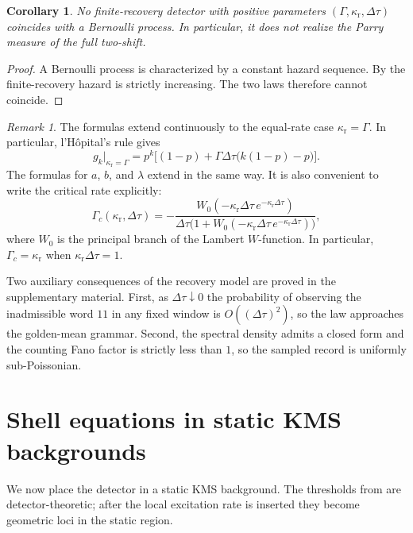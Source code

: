\documentclass[11pt]{amsart}
\numberwithin{equation}{section}
\newtheorem{corollary}[theorem]{Corollary}
\theoremstyle{remark}
\newtheorem{remark}[theorem]{Remark}
\begin{document}
\begin{corollary}\label{cor:no-exact-main}
No finite-recovery detector with positive parameters $(\Gamma,\kappa_{\mathrm r},\Delta\tau)$ coincides with a Bernoulli process. In particular, it does not realize the Parry measure of the full two-shift.
\end{corollary}

\begin{proof}
A Bernoulli process is characterized by a constant hazard sequence. By  the finite-recovery hazard is strictly increasing. The two laws therefore cannot coincide.
\end{proof}

\begin{remark}\label{rem:edge-cases}
The formulas extend continuously to the equal-rate case $\kappa_{\mathrm r}=\Gamma$. In particular, l'H\^opital's rule gives
\[
g_k\big|_{\kappa_{\mathrm r}=\Gamma}
=
p^k\bigl[(1-p)+\Gamma\Delta\tau\bigl(k(1-p)-p\bigr)\bigr].
\]
The formulas for $a$, $b$, and $\lambda$ extend in the same way. It is also convenient to write the critical rate explicitly:
\[
\Gamma_c(\kappa_{\mathrm r},\Delta\tau)
=
-\frac{W_0(-\kappa_{\mathrm r}\Delta\tau\,e^{-\kappa_{\mathrm r}\Delta\tau})}
{\Delta\tau\bigl(1+W_0(-\kappa_{\mathrm r}\Delta\tau\,e^{-\kappa_{\mathrm r}\Delta\tau})\bigr)},
\]
where $W_0$ is the principal branch of the Lambert $W$-function. In particular, $\Gamma_c=\kappa_{\mathrm r}$ when $\kappa_{\mathrm r}\Delta\tau=1$.
\end{remark}

Two auxiliary consequences of the recovery model are proved in the supplementary material. First, as $\Delta\tau\downarrow0$ the probability of observing the inadmissible word $11$ in any fixed window is $O((\Delta\tau)^2)$, so the law approaches the golden-mean grammar. Second, the spectral density admits a closed form and the counting Fano factor is strictly less than $1$, so the sampled record is uniformly sub-Poissonian.

\section{Shell equations in static KMS backgrounds}\label{sec:kms-shells}

We now place the detector in a static KMS background. The thresholds from  are detector-theoretic; after the local excitation rate is inserted they become geometric loci in the static region.
\end{document}
